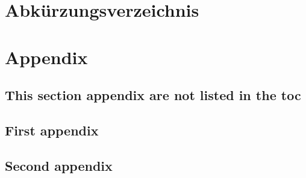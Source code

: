 \documentclass[
	12pt %
	,a4paper %
	,headings=normal %
	,toc=graduated %
	,bibliography=totoc %
]{scrreprt} %
\begin{document}
\pagebreak

\chapter*{Abkürzungsverzeichnis}
\begin{acronym}[Abk.] %
\end{acronym}

\newpage
\onehalfspacing %
\renewcommand{\thesection}{\arabic{section}}
\renewcommand{\theHsection}{\arabic{section}}
\setcounter{section}{0}
\setcounter{page}{1}



\clearpage
\pagebreak
\newpage


\renewcommand\refname{Quellenverzeichnis}


\pagebreak


\appendix
\chapter{Appendix}\label{cha:appendix}
\setcounter{page}{1}

\section*{This section appendix are not listed in the toc}\label{sec:appendixNotInToc}
\section{First appendix}\label{sec:firstAppendix}

\newpage

\section{Second appendix}\label{sec:secondAppendix}
\end{document}
